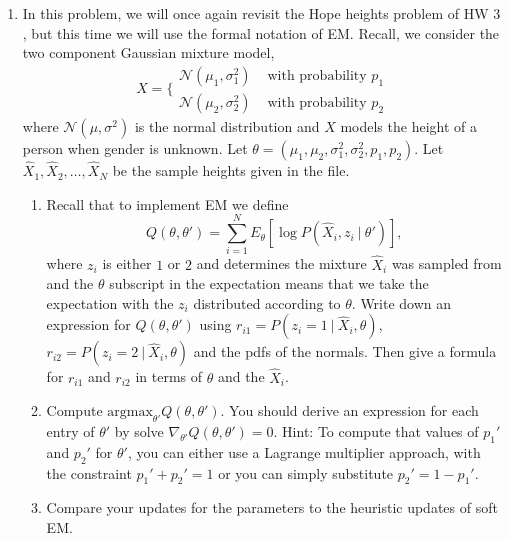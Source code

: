 \documentclass{article}
\begin{document}
\begin{enumerate} 

\item In this problem, we will once again revisit the Hope heights problem of HW $3$, but this time we will use the formal notation of EM.  Recall, we consider the two component Gaussian mixture model,
\begin{equation}
X = \bigg\{
\begin{array}{cc}
\mathcal{N}(\mu_1, \sigma_1^2) & \text{ with probability } p_1 \\
\mathcal{N}(\mu_2, \sigma_2^2) & \text{ with probability } p_2
\end{array}
\end{equation}
where $\mathcal{N}(\mu, \sigma^2)$ is the normal distribution and $X$ models the height of a person when gender is unknown.  Let $\theta = (\mu_1, \mu_2, \sigma_1^2, \sigma_2^2, p_1, p_2)$.   Let $\hat{X}_1, \hat{X}_2,\dots, \hat{X}_N$ be the sample heights given in the file.  
\begin{enumerate}
\item Recall that to implement EM we define 
\begin{equation}
Q(\theta, \theta') = \sum_{i=1}^N E_\theta[\log P(\hat{X}_i, z_i \ | \ \theta')],
\end{equation}
where $z_i$ is either $1$ or $2$ and determines the mixture $\hat{X}_i$ was sampled from and the $\theta$ subscript in the expectation means that we take the expectation with the $z_i$ distributed according to $\theta$.  Write down an expression for $Q(\theta, \theta')$ using $r_{i1} = P(z_i=1 \ | \ \hat{X}_i, \theta)$, $r_{i2} = P(z_i = 2 \ | \ \hat{X}_i, \theta)$ and the pdfs of the normals.  Then give a formula for $r_{i1}$ and $r_{i2}$ in terms of $\theta$ and the $\hat{X}_i$.
\item Compute $\text{argmax}_{\theta'} Q(\theta, \theta')$.   You should derive an expression for each entry of $\theta'$ by solve $\nabla_{\theta'} Q(\theta,\theta') = 0$.   Hint:  To compute that values of $p_1'$ and $p_2'$ for $\theta'$, you can either use a Lagrange multiplier approach, with the constraint $p_1' + p_2' = 1$ or you can simply substitute $p_2' = 1 - p_1'$.
\item  Compare your updates for the parameters to the heuristic updates of soft EM.
\end{enumerate}


\end{enumerate}
\end{document}
